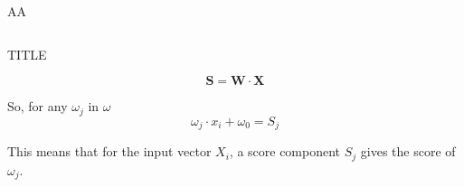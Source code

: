\documentclass{beamer}
\begin{document}


\begin{frame}{AA}
    \begin{columns}
        \begin{column}{0.5\textwidth}

        \end{column}
        \begin{column}{0.5\textwidth}

        \end{column}
    \end{columns}
\end{frame}



\begin{frame}{TITLE}

    \[ \mathbf{S} = \mathbf{W} \cdot \mathbf{X} \]

    So, for any $\omega_j$ in $\omega$ $$\omega_j \cdot x_i + \omega_0 = S_j $$

    This means that for the input vector $X_i$, a score component $S_j$ gives the score of $\omega_j$.

\end{frame}






\backmatter
\end{document}
